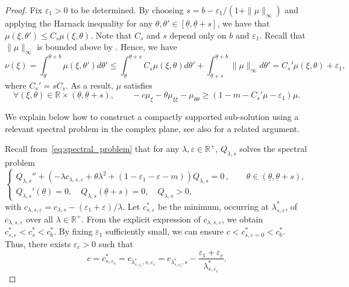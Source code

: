 \documentclass[11pt]{article}    %
\newcommand{\R}{\mathbb{R}}
\renewcommand{\epsilon}{\varepsilon}
\newcommand{\eps}{\varepsilon}
\begin{document}
\begin{proof}
Fix $\epsilon_1 > 0$ to be determined.  By choosing $s = b - \epsilon_1/(1+\|\mu\|_\infty)$ and applying the Harnack inequality for any $\theta, \theta' \in [\underline\theta, \underline \theta+s]$, we have that $\mu(\xi,\theta') \leq C_s \mu(\xi,\theta)$.  Note that $C_s$ and $s$ depend only on $b$ and $\epsilon_1$.  Recall that $\|\mu\|_\infty$ is bounded above by .  Hence, we have
\[
	\nu(\xi)
		= \int_{\underline\theta}^{\underline\theta + b} \mu(\xi,\theta')d\theta'
		\leq \int_{\underline\theta}^{\underline\theta + s} C_s \mu(\xi,\theta)d\theta' + \int_{\underline\theta+ s}^{\underline\theta + b} \|\mu\|_\infty d\theta'
		= C_s' \mu(\xi,\theta) + \epsilon_1,
\]
where $C_s' = s C_s$.
As a result, $\mu$ satisfies
\begin{equation*}
\forall \left( \xi , \theta \right) \in \R \times (\underline\theta,\underline\theta +s), \qquad - c \mu_{\xi}  - \theta \mu_{\xi\xi} - \mu_{\theta\theta} \geq \left(1 - m - C_s' \mu - \eps_1 \right)\mu.
\end{equation*}

We explain below how to construct a compactly supported sub-solution using a relevant spectral problem in the complex plane, see also \cite{BouinCalvez} for a related argument. 

Recall from~\eqref{eq:spectral_problem} that for any $\lambda, \eps \in \R^+$, $Q_{\lambda,s}$ solves the spectral problem
\begin{equation}\label{eq:spectral_problem_s}
\begin{cases} 
	Q_{\lambda,s}''+ \left( - \lambda c_{\lambda,s,\epsilon} + \theta \lambda^2   + \left( 1 - \epsilon_1 - \epsilon -  m \right) \right) Q_{\lambda,s} = 0\,, \qquad \theta \in (\underline\theta,\underline\theta + s), \\
	Q_{\lambda,s}'\left( \underline\theta \right) = 0, \quad Q_{\lambda,s}\left( \underline\theta + s\right) = 0, \quad Q_{\lambda,s} > 0,
\end{cases}
\end{equation}
with $c_{\lambda, s, \epsilon} = c_{\lambda, s} - (\epsilon_1 + \epsilon)/\lambda$. 
Let $c^*_{s,\epsilon}$ be the minimum, occurring at $\lambda_{s,\epsilon}^*$, of $c_{\lambda,s,\epsilon}$ over all $\lambda \in \R^+$. From the explicit expression of  $c_{\lambda,s,\epsilon}$, we obtain $c^*_{s,\epsilon} < c^*_s <c^*_b$. By fixing $\eps_1$ sufficiently small, we can ensure $c < c^*_{s,\epsilon=0} < c^*_b$. Thus, there exists $\epsilon_c > 0$ such that
\[
	c = c_{s,\epsilon_c}^* = c_{\lambda_{s,\epsilon_c}^*,s,\epsilon_c} = c_{\lambda_{s,\epsilon_c}^*,s} - \frac{\epsilon_1 +\epsilon_c}{\lambda_{s,\epsilon_c}^*}.
\]


\end{proof}
\end{document}
